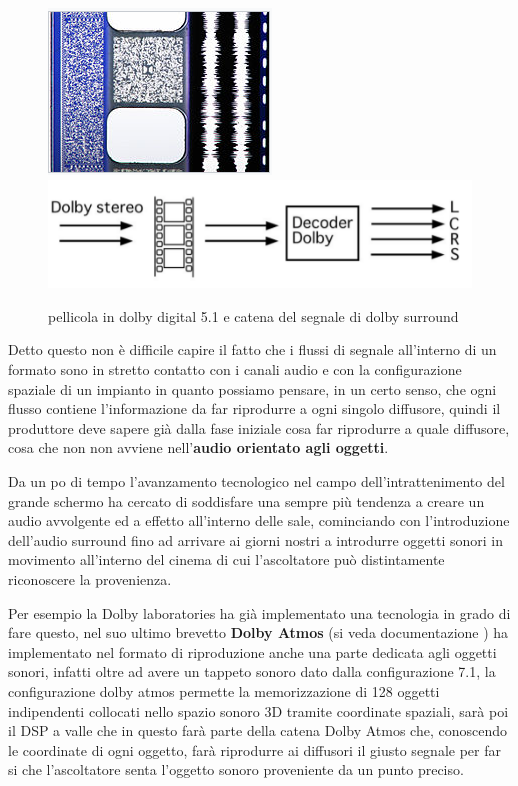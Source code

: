 \documentclass[12pt,a4paper]{report}
\begin{document}
\begin{figure}[htbp]
	\centering
	\includegraphics[scale=0.5]{figures/pellicola.png} \ \ \ \ \ \ \ \ \ \ \ \ \ \ \ \ \includegraphics[scale=0.5]{figures/dolbysurround.png}
	\caption {pellicola in dolby digital 5.1 e catena del segnale di dolby surround}
	\label{fig:decodifica}
	\end{figure}

Detto questo non è difficile capire il fatto che i flussi di segnale all'interno di un formato sono in stretto contatto con i canali audio e con la configurazione spaziale di un impianto in quanto possiamo pensare, in un certo senso, che ogni flusso contiene l'informazione da far riprodurre a ogni singolo diffusore, quindi il produttore deve sapere già dalla fase iniziale cosa far riprodurre a quale diffusore, cosa che non non avviene nell'\textbf{audio orientato agli oggetti}.

Da un po di tempo l'avanzamento tecnologico nel campo dell'intrattenimento del grande schermo ha cercato di soddisfare una sempre più tendenza a creare un audio avvolgente ed a effetto all'interno delle sale, cominciando con l'introduzione dell'audio surround fino ad arrivare ai giorni nostri a introdurre oggetti sonori in movimento all'interno del cinema di cui l'ascoltatore può distintamente riconoscere la provenienza.

Per esempio la Dolby laboratories ha già implementato una tecnologia in grado di fare questo, nel suo ultimo brevetto \textbf{Dolby Atmos} (si veda documentazione \cite{atmos}) ha implementato nel formato di riproduzione anche una parte dedicata agli oggetti sonori, infatti oltre ad avere un tappeto sonoro dato dalla configurazione 7.1, la configurazione dolby atmos permette la memorizzazione di 128 oggetti indipendenti collocati nello spazio sonoro 3D tramite coordinate spaziali, sarà poi il DSP a valle che in questo farà parte della catena Dolby Atmos che, conoscendo le coordinate di ogni oggetto, farà riprodurre ai diffusori il giusto segnale per far si che l'ascoltatore senta l'oggetto sonoro proveniente da un punto preciso.
\end{document}
